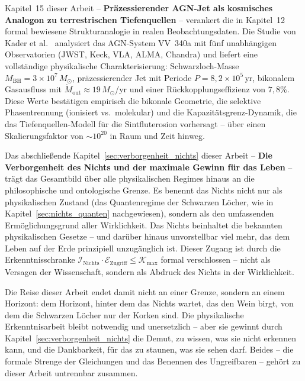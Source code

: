 ﻿\documentclass[12pt,a4paper]{report}
\begin{document}
\medskip

Kapitel~15 dieser Arbeit -- \textbf{Präzessierender AGN-Jet als kosmisches Analogon zu terrestrischen Tiefenquellen} -- verankert die in Kapitel~12 formal bewiesene Strukturanalogie in realen Beobachtungsdaten. Die Studie von Kader et al.\ \cite{kader2026} analysiert das AGN-System VV~340a mit fünf unabhängigen Observatorien (JWST, Keck, VLA, ALMA, Chandra) und liefert eine vollständige physikalische Charakterisierung: Schwarzloch-Masse $M_\mathrm{BH} = 3 \times 10^7\,M_\odot$, präzessierender Jet mit Periode $P = 8{,}2 \times 10^5$\,yr, bikonalem Gasausfluss mit $\dot{M}_\mathrm{out} \approx 19\,M_\odot$/yr und einer Rückkopplungseffizienz von $7{,}8\%$. Diese Werte bestätigen empirisch die bikonale Geometrie, die selektive Phasentrennung (ionisiert vs.\ molekular) und die Kapazitätsgrenz-Dynamik, die das Tiefenquellen-Modell für die Sintfluterosion vorhersagt -- über einen Skalierungsfaktor von $\sim 10^{20}$ in Raum und Zeit hinweg.

\medskip

Das abschließende Kapitel~\ref{sec:verborgenheit_nichts} dieser Arbeit -- \textbf{Die Verborgenheit des Nichts und der maximale Gewinn für das Leben} -- trägt das Gesamtbild über alle physikalischen Regimes hinaus an die philosophische und ontologische Grenze. Es benennt das Nichts nicht nur als physikalischen Zustand (das Quantenregime der Schwarzen Löcher, wie in Kapitel~\ref{sec:nichts_quanten} nachgewiesen), sondern als den umfassenden Ermöglichungsgrund aller Wirklichkeit. Das Nichts beinhaltet die bekannten physikalischen Gesetze -- und darüber hinaus unvorstellbar viel mehr, das dem Leben auf der Erde prinzipiell unzugänglich ist. Dieser Zugang ist durch die Erkenntnisschranke $\mathcal{I}_{\text{Nichts}} \cdot \mathcal{E}_{\text{Zugriff}} \leq \mathcal{K}_{\max}$ formal verschlossen -- nicht als Versagen der Wissenschaft, sondern als Abdruck des Nichts in der Wirklichkeit.

Die Reise dieser Arbeit endet damit nicht an einer Grenze, sondern an einem Horizont: dem Horizont, hinter dem das Nichts wartet, das den Wein birgt, von dem die Schwarzen Löcher nur der Korken sind. Die physikalische Erkenntnisarbeit bleibt notwendig und unersetzlich -- aber sie gewinnt durch Kapitel~\ref{sec:verborgenheit_nichts} die Demut, zu wissen, was sie nicht erkennen kann, und die Dankbarkeit, für das zu staunen, was sie sehen darf. Beides -- die formale Strenge der Gleichungen und das Benennen des Ungreifbaren -- gehört zu dieser Arbeit untrennbar zusammen.
\end{document}
